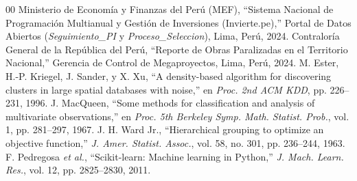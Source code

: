 \documentclass[conference]{IEEEtran}
\begin{document}
\begin{thebibliography}{00}
 Ministerio de Econom\'ia y Finanzas del Per\'u (MEF), ``Sistema Nacional de Programaci\'on Multianual y Gesti\'on de Inversiones (Invierte.pe),'' Portal de Datos Abiertos (\textit{Seguimiento\_PI} y \textit{Proceso\_Seleccion}), Lima, Per\'u, 2024.
 Contralor\'ia General de la Rep\'ublica del Per\'u, ``Reporte de Obras Paralizadas en el Territorio Nacional,'' Gerencia de Control de Megaproyectos, Lima, Per\'u, 2024.
 M. Ester, H.-P. Kriegel, J. Sander, y X. Xu, ``A density-based algorithm for discovering clusters in large spatial databases with noise,'' en \textit{Proc. 2nd ACM KDD}, pp. 226--231, 1996.
 J. MacQueen, ``Some methods for classification and analysis of multivariate observations,'' en \textit{Proc. 5th Berkeley Symp. Math. Statist. Prob.}, vol. 1, pp. 281--297, 1967.
 J. H. Ward Jr., ``Hierarchical grouping to optimize an objective function,'' \textit{J. Amer. Statist. Assoc.}, vol. 58, no. 301, pp. 236--244, 1963.
 F. Pedregosa \textit{et al.}, ``Scikit-learn: Machine learning in Python,'' \textit{J. Mach. Learn. Res.}, vol. 12, pp. 2825--2830, 2011.
\end{thebibliography}
\end{document}
